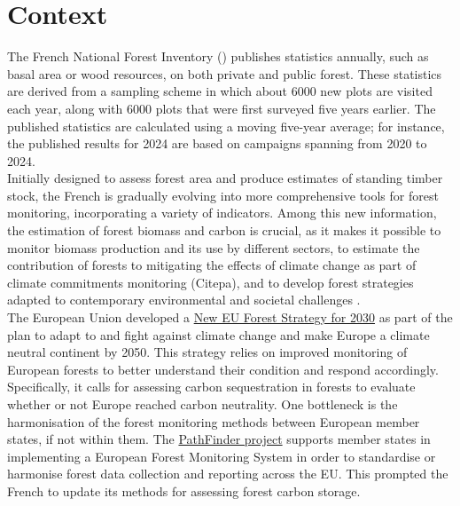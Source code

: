 \chapter{Context\label{chap::context}}

The French National Forest Inventory (\NFI) publishes statistics annually, such as basal area or wood resources, on both private and public forest. These statistics are derived from a sampling scheme in which about \num{6000} new plots are visited each year, along with \num{6000} plots that were first surveyed five years earlier. The published statistics are calculated using a moving five-year average; for instance, the published results for 2024 are based on campaigns spanning from 2020 to 2024. \\

Initially designed to assess forest area and produce estimates of standing timber stock, the French \NFI{} is gradually evolving into more comprehensive tools for forest monitoring, incorporating a variety of indicators. Among this new information, the estimation of forest biomass and carbon is crucial, as it makes it possible to monitor biomass production and its use by different sectors, to estimate the contribution of forests to mitigating the effects of climate change as part of climate commitments monitoring (Citepa), and to develop forest strategies adapted to contemporary environmental and societal challenges \parencite{Commission2018}. \\


The European Union developed a \href{https://eur-lex.europa.eu/legal-content/EN/TXT/?uri=CELEX:52021DC0572}{New EU Forest Strategy for 2030} as part of the plan to adapt to and fight against climate change and make Europe a climate neutral continent by 2050. This strategy relies on improved monitoring of European forests to better understand their condition and respond accordingly. Specifically, it calls for assessing carbon sequestration in forests to evaluate whether or not Eu\-ro\-pe reached carbon neutrality. One bottleneck is the harmonisation of the forest monitoring methods between European member states, if not within them. The \href{https://pathfinder-heu.eu/#top}{PathFinder project} supports member states in implementing a European Forest Monitoring System in order to standardise or harmonise forest data collection and reporting across the EU. This prompted the French \NFI{} to update its methods for assessing forest carbon storage. \\

